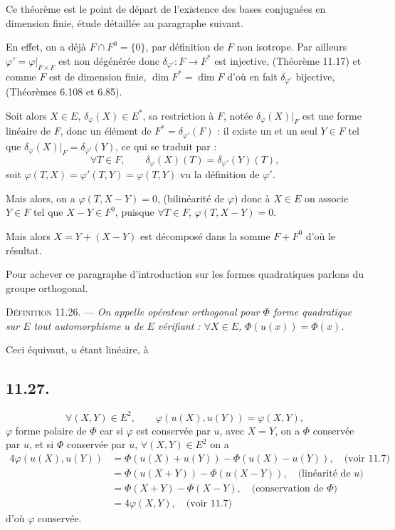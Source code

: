 Ce théorème est le point de départ de l'existence des bases conjuguées en dimension finie, étude détaillée au paragraphe suivant.

En effet, on a déjà $F\cap F^0=\{0\}$, par définition de $F$ non isotrope. Par ailleurs $\varphi'=\varphi|_{F\times F}$ est non dégénérée donc $\delta_{\varphi'}:F\longrightarrow F^*$ est injective, (Théorème 11.17) et comme $F$ est de dimension finie, $\dim F^*=\dim F$ d'où en fait $\delta_{\varphi'}$ bijective, (Théorèmes 6.108 et 6.85).

Soit alors $X\in E$, $\delta_\varphi(X)\in E^*$, sa restriction à $F$, notée $\delta_\varphi(X)|_F$ est une forme linéaire de $F$, donc un élément de $F^*=\delta_{\varphi'}(F)$ : il existe un et un seul $Y\in F$ tel que $\delta_\varphi(X)|_F=\delta_{\varphi'}(Y)$, ce qui se traduit par :
\[
\forall T\in F,\qquad \delta_\varphi(X)(T)=\delta_{\varphi'}(Y)(T),
\]
soit $\varphi(T,X)=\varphi'(T,Y)=\varphi(T,Y)$ vu la définition de $\varphi'$.

Mais alors, on a $\varphi(T,X-Y)=0$, (bilinéarité de $\varphi$) donc à $X\in E$ on associe $Y\in F$ tel que $X-Y\in F^0$, puisque $\forall T\in F$, $\varphi(T,X-Y)=0$.

Mais alors $X=Y+(X-Y)$ est décomposé dans la somme $F+F^0$ d'où le résultat. \bookend

Pour achever ce paragraphe d'introduction sur les formes quadratiques parlons du groupe orthogonal.

\medskip\noindent\textsc{Définition 11.26.} --- \emph{On appelle opérateur orthogonal pour $\Phi$ forme quadratique sur $E$ tout automorphisme $u$ de $E$ vérifiant : $\forall X\in E$, $\Phi(u(x))=\Phi(x)$.}

Ceci équivaut, $u$ étant linéaire, à

\subsection*{11.27.}
\[
\forall(X,Y)\in E^2,\qquad \varphi(u(X),u(Y))=\varphi(X,Y),
\]
$\varphi$ forme polaire de $\Phi$ car si $\varphi$ est conservée par $u$, avec $X=Y$, on a $\Phi$ conservée par $u$, et si $\Phi$ conservée par $u$, $\forall(X,Y)\in E^2$ on a
\begin{align*}
4\varphi(u(X),u(Y))
&=\Phi(u(X)+u(Y))-\Phi(u(X)-u(Y)),\quad\text{(voir 11.7)}\\
&=\Phi(u(X+Y))-\Phi(u(X-Y)),\quad\text{(linéarité de $u$)}\\
&=\Phi(X+Y)-\Phi(X-Y),\quad\text{(conservation de $\Phi$)}\\
&=4\varphi(X,Y),\quad\text{(voir 11.7)}
\end{align*}
d'où $\varphi$ conservée. \bookend

